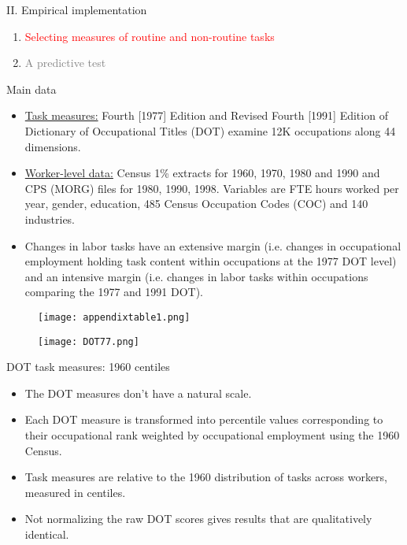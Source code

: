 \documentclass[notes=show]{beamer}
\begin{document}
\begin{frame}{II. Empirical implementation}
\begin{enumerate}
\item[\textcolor{red}{II.A}] \textcolor{red}{Selecting measures of routine and non-routine tasks} \bigskip
\item[\textcolor{gray}{II.B}]  \textcolor{gray}{A predictive test} \bigskip
\end{enumerate}
\end{frame}

\begin{frame}{Main data}
\begin{itemize}
\item \underline{Task measures:} Fourth [1977] Edition and Revised Fourth [1991] Edition of Dictionary of Occupational Titles (DOT) examine 12K occupations along 44 dimensions.\medskip
\item \underline{Worker-level data:} Census 1\% extracts for 1960, 1970, 1980 and 1990 and CPS (MORG) files for 1980, 1990, 1998. Variables are FTE hours worked per year, gender, education, 485 Census Occupation Codes (COC) and 140 industries. \medskip
\item Changes in labor tasks have an extensive margin (i.e. changes in occupational employment holding task content within occupations at the 1977 DOT level) and an intensive margin (i.e. changes in labor tasks within occupations comparing the 1977 and 1991 DOT).
\end{itemize}
\end{frame}

\newpage
\begin{center}
\begin{figure}
\texttt{[image: appendixtable1.png]}
\end{figure} 
\end{center}
\newpage

\newpage
\begin{center}
\begin{figure}
\texttt{[image: DOT77.png]}
\end{figure} 
\end{center}
\newpage

\begin{frame}{DOT task measures: 1960 centiles}
\begin{itemize}
\item The DOT measures don't have a natural scale. \medskip
\item Each DOT measure is transformed into percentile values corresponding to their occupational rank weighted by occupational employment using the 1960 Census. \medskip
\item Task measures are relative to the 1960 distribution of tasks across workers, measured in centiles. \medskip
\item Not normalizing the raw DOT scores gives results that are qualitatively identical.
\end{itemize}
\end{frame}
\end{document}

